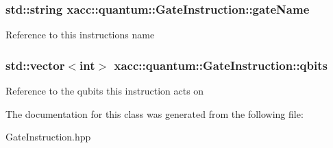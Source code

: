 \subsubsection[{\texorpdfstring{gate\+Name}{gateName}}]{\setlength{\rightskip}{0pt plus 5cm}std\+::string xacc\+::quantum\+::\+Gate\+Instruction\+::gate\+Name\hspace{0.3cm}{\ttfamily [protected]}}\hypertarget{a00112_a9961e6979139ced70300188cf2e4ad3f}{}\label{a00112_a9961e6979139ced70300188cf2e4ad3f}
Reference to this instructions name 
\subsubsection[{\texorpdfstring{qbits}{qbits}}]{\setlength{\rightskip}{0pt plus 5cm}std\+::vector$<$int$>$ xacc\+::quantum\+::\+Gate\+Instruction\+::qbits\hspace{0.3cm}{\ttfamily [protected]}}\hypertarget{a00112_a2a56be6c2519ea65df4d06f4abae1393}{}\label{a00112_a2a56be6c2519ea65df4d06f4abae1393}
Reference to the qubits this instruction acts on 

The documentation for this class was generated from the following file\+:\begin{DoxyCompactItemize}
\item 
Gate\+Instruction.\+hpp\end{DoxyCompactItemize}
